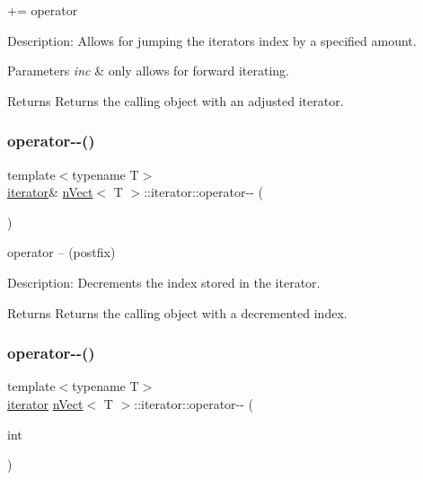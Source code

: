 += operator 

Description\+: Allows for jumping the iterator\textquotesingle{}s index by a specified amount. 
\begin{DoxyParams}{Parameters}
{\em inc} & only allows for forward iterating. \\
\hline
\end{DoxyParams}
\begin{DoxyReturn}{Returns}
Returns the calling object with an adjusted iterator. 
\end{DoxyReturn}
\mbox{\label{classnVect_1_1iterator_a65e426d74204084e00d8d6770b88b790}} 
\subsubsection{\texorpdfstring{operator-\/-\/()}{operator--()}\hspace{0.1cm}{\footnotesize\ttfamily [1/2]}}
{\footnotesize\ttfamily template$<$typename T$>$ \\
\hyperlink{classnVect_1_1iterator}{iterator}\& \hyperlink{classnVect}{n\+Vect}$<$ T $>$\+::iterator\+::operator-\/-\/ (\begin{DoxyParamCaption}{ }\end{DoxyParamCaption})\hspace{0.3cm}{\ttfamily [inline]}}



operator -- (postfix) 

Description\+: Decrements the index stored in the iterator. \begin{DoxyReturn}{Returns}
Returns the calling object with a decremented index. 
\end{DoxyReturn}
\mbox{\label{classnVect_1_1iterator_aa99d3a05bc566f235dcc06c3b57e21d3}} 
\subsubsection{\texorpdfstring{operator-\/-\/()}{operator--()}\hspace{0.1cm}{\footnotesize\ttfamily [2/2]}}
{\footnotesize\ttfamily template$<$typename T$>$ \\
\hyperlink{classnVect_1_1iterator}{iterator} \hyperlink{classnVect}{n\+Vect}$<$ T $>$\+::iterator\+::operator-\/-\/ (\begin{DoxyParamCaption}\item[{int}]{ }\end{DoxyParamCaption})\hspace{0.3cm}{\ttfamily [inline]}}



